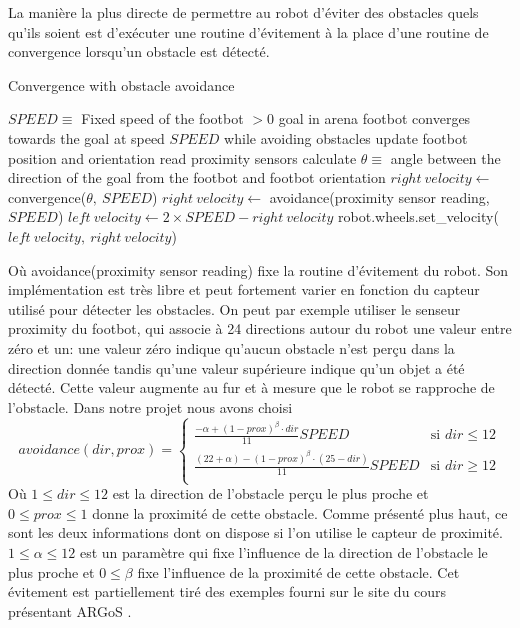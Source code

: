 La manière la plus directe de permettre au robot d'éviter des obstacles quels qu'ils soient est d'exécuter une routine d'évitement à la place d'une routine de convergence lorsqu'un obstacle est détecté.
\begin{algorithm}                    
\caption{Convergence with obstacle avoidance}
\label{obstacleConvergence}
\begin{algorithmic}[1]
  \REQUIRE \(SPEED \equiv \) Fixed speed of the footbot \(> 0\)
  \REQUIRE goal in arena
  \ENSURE footbot converges towards the goal at speed \(SPEED\) while avoiding obstacles
    \STATE update footbot position and orientation
    \STATE read proximity sensors 
      \STATE calculate \( \theta \equiv\) angle between the direction of the goal from the footbot and footbot orientation
      \STATE \( right\:velocity \leftarrow\) convergence(\(\theta,\:SPEED\))
    \ELSE
      \STATE \( right\:velocity \leftarrow\) avoidance(proximity sensor reading, \(SPEED\))
    \ENDIF
    \STATE \( left\:velocity \leftarrow 2 \times SPEED-right\:velocity\) 
    \STATE robot.wheels.set\_velocity(\(left\:velocity,\:right\:velocity\))
  \ENDWHILE
\end{algorithmic}
\end{algorithm}

Où avoidance(proximity sensor reading) fixe la routine d'évitement du robot. Son implémentation est très libre et peut fortement varier en fonction du capteur utilisé pour détecter les obstacles. On peut par exemple utiliser le senseur proximity du footbot, qui associe à 24 directions autour du robot une valeur entre zéro et un: une valeur zéro indique qu'aucun obstacle n'est perçu dans la direction donnée tandis qu'une valeur supérieure indique qu'un objet a été détecté. Cette valeur augmente au fur et à mesure que le robot se rapproche de l'obstacle.\cite{argosSite1} Dans notre projet nous avons choisi
\[avoidance(dir, prox)=
  \begin{cases}
      \frac{-\alpha +(1-prox)^{\beta}\cdot dir}{11}SPEED & \text{si }dir \leq 12\\
      \frac{(22+\alpha )-(1-prox)^{\beta}\cdot (25-dir)}{11}SPEED & \text{si }dir \geq 12\\
  \end{cases}
\]
Où $ 1 \leq dir \leq 12 $ est la direction de l'obstacle perçu le plus proche et \hbox{$0 \leq prox \leq 1$} donne la proximité de cette obstacle. Comme présenté plus haut, ce sont les deux informations dont on dispose si l'on utilise le capteur de proximité.  \(1 \leq \alpha \leq 12 \) est un paramètre qui fixe l'influence de la direction de l'obstacle le plus proche et \(0 \leq \beta \) fixe l'influence de la proximité de cette obstacle. Cet évitement est partiellement tiré des exemples fourni sur le site du cours présentant ARGoS \cite{argosSite1}.

